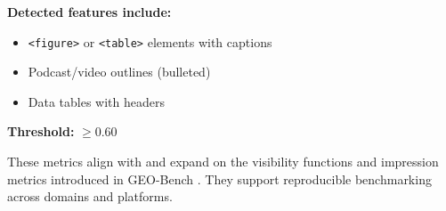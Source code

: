 \textbf{Detected features include:}
\begin{itemize}
  \item \texttt{<figure>} or \texttt{<table>} elements with captions
  \item Podcast/video outlines (bulleted)
  \item Data tables with headers
\end{itemize}

\textbf{Threshold:} $\geq 0.60$

These metrics align with and expand on the visibility functions and impression metrics introduced in GEO-Bench \cite{aggarwal2024geo}. They support reproducible benchmarking across domains and platforms.
